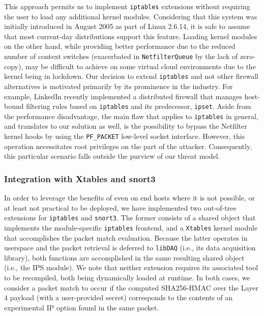 This approach permits us to implement \texttt{iptables} extensions without requiring the user to load any additional kernel modules. Considering that this system was initially introduced in August 2005 as part of Linux 2.6.14, it is safe to assume that most current-day distributions support this feature. Loading kernel modules on the other hand, while providing better performance due to the reduced number of context switches (exacerbated in \texttt{NetfilterQueue} by the lack of zero-copy), may be difficult to achieve on some virtual cloud environments due to the kernel being in lockdown. Our decision to extend \texttt{iptables} and not other firewall alternatives is motivated primarily by its prominence in the industry. For example, LinkedIn recently implemented a distributed firewall \cite{linkedin_dfw} that manages host-bound filtering rules based on \texttt{iptables} and its predecessor, \texttt{ipset}. Aside from the performance disadvantage, the main flaw that applies to \texttt{iptables} in general, and translates to our solution as well, is the possibility to bypass the Netfilter kernel hooks by using the \texttt{PF\_PACKET} low-level socket interface. However, this operation necessitates root privileges on the part of the attacker. Consequently, this particular scenario falls outside the purview of our threat model.


\subsubsection{Integration with Xtables and snort3}

In order to leverage the benefits of \daf{} even on end hosts where it is not possible, or at least not practical to be deployed, we have implemented two out-of-tree extensions for \texttt{iptables} and \texttt{snort3}. The former consists of a shared object that implements the module-specific \texttt{iptables} frontend, and a \texttt{Xtables} kernel module that accomplishes the packet match evaluation. Because the latter operates in userspace and the packet retrieval is deferred to \texttt{libDAQ} (i.e., its data acquisition library), both functions are accomplished in the same resulting shared object (i.e., the IPS module). We note that neither extension requires its associated tool to be recompiled, both being dynamically loaded at runtime. In both cases, we consider a packet match to occur if the computed SHA256-HMAC over the Layer 4 payload (with a user-provided secret) corresponds to the contents of an experimental IP option found in the same packet.


